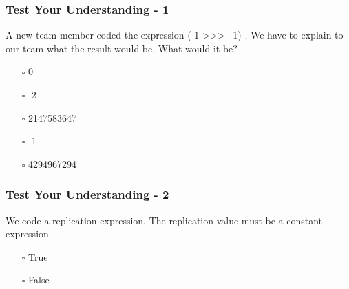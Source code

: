 \documentclass[t, notes, xcolor=table]{beamer}
\begin{document}
\begin{frame}
\frametitle{Test Your Understanding - 1}
A new team member coded the expression (-1 \textgreater\textgreater\textgreater\ -1) . We have to explain to our team what the result would be. What would it be?
\begin{itemize}
\item[$\square$] 0
\item[$\square$] -2
\item[$\square$] 2147583647
\item[$\square$] -1
\item[$\square$] 4294967294
\end{itemize}
\end{frame}

\begin{frame}
\frametitle{Test Your Understanding - 2}
We code a replication expression. The replication value must be a constant expression.
\begin{itemize}
\item[$\square$] True
\item[$\square$] False
\end{itemize}
\end{frame}
\end{document}
